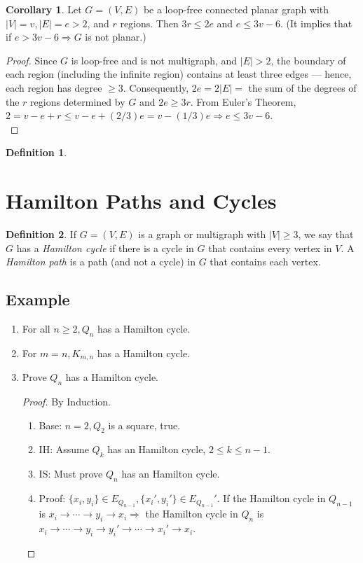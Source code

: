 \documentclass[letter]{book}
\theoremstyle{definition}
\newtheorem{corollary}{Corollary}[chapter]
\theoremstyle{definition}
\newtheorem{mydef}{Definition}[chapter]
\theoremstyle{remark}
\begin{document}
\bigskip
\begin{corollary}
    Let $G=(V,E)$ be a loop-free connected planar graph with $|V|=v,|E|=e>2$, and $r$ regions. Then $3r\leq 2e$ and $e\leq 3v-6$. (It implies that if $e>3v-6\Rightarrow G$ is not planar.)
\end{corollary}
\begin{proof}
    Since $G$ is loop-free and is not multigraph, and $|E|>2$, the boundary of each region (including the infinite region) contains at least three edges --- hence, each region has degree $\geq 3$. Consequently, $2e=2|E|=$ the sum of the degrees of the $r$ regions determined by $G$ and $2e\geq 3r$. From Euler's Theorem, $2=v-e+r\leq v-e+(2/3)e=v-(1/3)e\Rightarrow e\leq 3v-6$.\\
\end{proof}
\bigskip
\begin{mydef}
    
\end{mydef}
\section{Hamilton Paths and Cycles}
\begin{mydef}
    If $G=(V,E)$ is a graph or multigraph with $|V|\geq 3$, we say that $G$ has a \textit{Hamilton cycle} if there is a cycle in $G$ that contains every vertex in $V$. A \textit{Hamilton path} is a path (and not a cycle) in $G$ that contains each vertex.
\end{mydef}
\subsection*{Example}
    \begin{enumerate}
        \item For all $n\geq 2, Q_n$ has a Hamilton cycle.
        \item For $m=n, K_{m,n}$ has a Hamilton cycle.
        \item Prove $Q_n$ has a Hamilton cycle.
            \begin{proof} By Induction.\\
                \begin{enumerate}
                    \item Base: $n=2, Q_2$ is a square, true.
                    \item IH: Assume $Q_k$ has an Hamilton cycle, $2\leq k\leq n-1$.
                    \item IS: Must prove $Q_n$ has an Hamilton cycle.
                    \item Proof: $\{x_i,y_i\}\in E_{Q_{n-1}}, \{x_i',y_i'\}\in {E_{Q_{n-1}}'}$. If the Hamilton cycle in $Q_{n-1}$ is $x_i\rightarrow\cdots\rightarrow y_i\rightarrow x_i\Rightarrow$ the Hamilton cycle in $Q_n$ is $x_i\rightarrow \cdots\rightarrow y_i\rightarrow y_i'\rightarrow \cdots\rightarrow x_i'\rightarrow x_i$.
                \end{enumerate}
            \end{proof}
    \end{enumerate}
\end{document}
